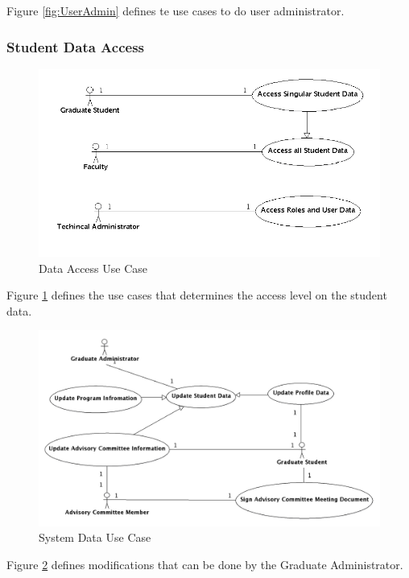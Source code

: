 \documentclass{journal}
\begin{document}
Figure \ref{fig:UserAdmin} defines te use cases to do user administrator. 

\subsubsection{Student Data Access}
\begin{figure}[htp]
\centering
\includegraphics[scale=0.5]{diagrams/use_cases/access_uc.png}
\caption{Data Access Use Case}
\label{fig:UserAccess}
\end{figure}

Figure \ref{fig:UserAccess} defines the use cases that determines the access level on the student data.

\begin{figure}[htp]
\centering
\includegraphics[scale=0.25]{diagrams/use_cases/system_data_uc.png}
\caption{System Data Use Case}
\label{fig:SystemData}
\end{figure}

Figure \ref{fig:SystemData} defines modifications that can be done by the Graduate Administrator. 
\end{document}
